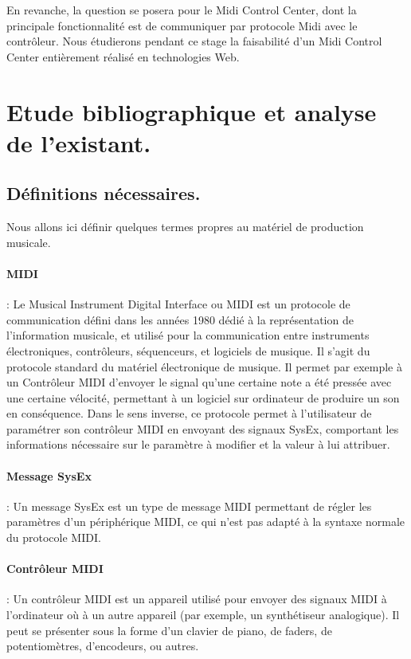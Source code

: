\documentclass[francais]{rapportPFE}  %
\begin{document}
En revanche, la question se posera pour le Midi Control Center, dont la principale fonctionnalité est de communiquer par protocole Midi avec le contrôleur. Nous étudierons pendant ce stage la faisabilité d'un Midi Control Center entièrement réalisé en technologies Web.

\section{Etude bibliographique et analyse de l'existant.}


\subsection{Définitions nécessaires.}

Nous allons ici définir quelques termes propres au matériel de production musicale.
\paragraph{MIDI} \cite{midi}
: Le Musical Instrument Digital Interface ou MIDI est un protocole de communication défini dans les années 1980 dédié à la représentation de l'information musicale, et utilisé pour la communication entre instruments électroniques, contrôleurs, séquenceurs, et logiciels de musique. Il s'agit du protocole standard du matériel électronique de musique. Il permet par exemple à un Contrôleur MIDI d'envoyer le signal qu'une certaine note a été pressée avec une certaine vélocité, permettant à un logiciel sur ordinateur de produire un son en conséquence. Dans le sens inverse, ce protocole permet à l'utilisateur de paramétrer son contrôleur MIDI en envoyant des signaux SysEx, comportant les informations nécessaire sur le paramètre à modifier et la valeur à lui attribuer.
\paragraph{Message SysEx} \cite{sysex}
: Un message SysEx est un type de message MIDI permettant de régler les paramètres d'un périphérique MIDI, ce qui n'est pas adapté à la syntaxe normale du protocole MIDI. 
\paragraph{Contrôleur MIDI}  \cite{controller}
:  Un contrôleur MIDI est un appareil utilisé pour envoyer des signaux MIDI à l'ordinateur où à un autre appareil (par exemple, un synthétiseur analogique). Il peut se présenter sous la forme d'un clavier de piano, de faders, de potentiomètres, d'encodeurs, ou autres.
\end{document}
